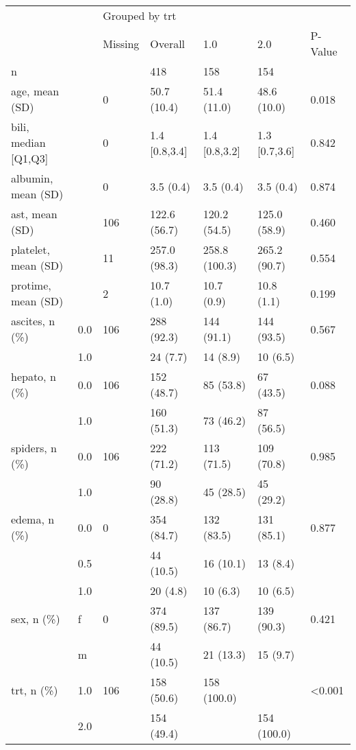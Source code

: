 \begin{tabular}{lllllll}
\toprule
           &     & \multicolumn{5}{l}{Grouped by trt} \\
           &     &        Missing &        Overall &            1.0 &            2.0 & P-Value \\
\midrule
n & {} &                &            418 &            158 &            154 &         \\
age, mean (SD) &     &              0 &    50.7 (10.4) &    51.4 (11.0) &    48.6 (10.0) &   0.018 \\
bili, median [Q1,Q3] &     &              0 &  1.4 [0.8,3.4] &  1.4 [0.8,3.2] &  1.3 [0.7,3.6] &   0.842 \\
albumin, mean (SD) &     &              0 &      3.5 (0.4) &      3.5 (0.4) &      3.5 (0.4) &   0.874 \\
ast, mean (SD) &     &            106 &   122.6 (56.7) &   120.2 (54.5) &   125.0 (58.9) &   0.460 \\
platelet, mean (SD) &     &             11 &   257.0 (98.3) &  258.8 (100.3) &   265.2 (90.7) &   0.554 \\
protime, mean (SD) &     &              2 &     10.7 (1.0) &     10.7 (0.9) &     10.8 (1.1) &   0.199 \\
ascites, n (\%) & 0.0 &            106 &     288 (92.3) &     144 (91.1) &     144 (93.5) &   0.567 \\
           & 1.0 &                &       24 (7.7) &       14 (8.9) &       10 (6.5) &         \\
hepato, n (\%) & 0.0 &            106 &     152 (48.7) &      85 (53.8) &      67 (43.5) &   0.088 \\
           & 1.0 &                &     160 (51.3) &      73 (46.2) &      87 (56.5) &         \\
spiders, n (\%) & 0.0 &            106 &     222 (71.2) &     113 (71.5) &     109 (70.8) &   0.985 \\
           & 1.0 &                &      90 (28.8) &      45 (28.5) &      45 (29.2) &         \\
edema, n (\%) & 0.0 &              0 &     354 (84.7) &     132 (83.5) &     131 (85.1) &   0.877 \\
           & 0.5 &                &      44 (10.5) &      16 (10.1) &       13 (8.4) &         \\
           & 1.0 &                &       20 (4.8) &       10 (6.3) &       10 (6.5) &         \\
sex, n (\%) & f &              0 &     374 (89.5) &     137 (86.7) &     139 (90.3) &   0.421 \\
           & m &                &      44 (10.5) &      21 (13.3) &       15 (9.7) &         \\
trt, n (\%) & 1.0 &            106 &     158 (50.6) &    158 (100.0) &                &  <0.001 \\
           & 2.0 &                &     154 (49.4) &                &    154 (100.0) &         \\
\bottomrule
\end{tabular}
